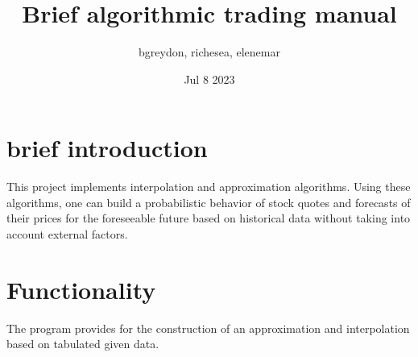 \documentclass[12pt, a4paper]{article}
\title{Brief algorithmic trading manual}
\author{bgreydon, richesea, elenemar}
\date{Jul 8 2023}
\begin{document}
    \maketitle

    \pagebreak


    \section{brief introduction}

    This project implements interpolation and approximation algorithms.
    Using these algorithms, one can build a probabilistic behavior of stock quotes and forecasts of their prices for the foreseeable future based on historical data without taking into account external factors.

    \pagebreak


    \section{Functionality}

    The program provides for the construction of an approximation and interpolation based on tabulated given data.
\end{document}
